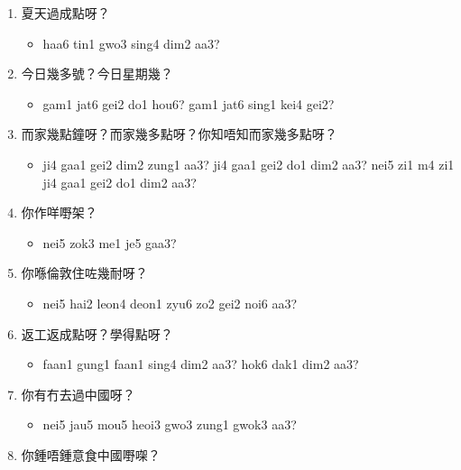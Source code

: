 \documentclass[12pt,a4paper]{leaflet}
\begin{document}
\begin{tcolorbox}[enhanced, breakable, skin first=enhanced, skin middle=enhanced, skin last=enhanced,colback=LightGreen!20!white, colframe=LightGreen!50!black, boxrule=0.5mm]
\begin{enumerate}[label={},leftmargin=0pt, itemindent=0pt]
\begin{itemize}[label={},leftmargin=0pt, itemindent=0pt]
\end{itemize}
\item \LARGE{夏天過成點呀？}
\begin{itemize}[label={},leftmargin=0pt, itemindent=0pt]
\item \footnotesize\textsf{haa6 tin1 gwo3 sing4 dim2 aa3?}
\end{itemize}
\item \LARGE{今日幾多號？今日星期幾？}
\begin{itemize}[label={},leftmargin=0pt, itemindent=0pt]
\item \footnotesize\textsf{gam1 jat6 gei2 do1 hou6? gam1 jat6 sing1 kei4 gei2?}
\end{itemize}
\item \LARGE{而家幾點鐘呀？而家幾多點呀？你知唔知而家幾多點呀？}
\begin{itemize}[label={},leftmargin=0pt, itemindent=0pt]
\item \footnotesize\textsf{ji4 gaa1 gei2 dim2 zung1 aa3? ji4 gaa1 gei2 do1 dim2 aa3? nei5 zi1 m4 zi1 ji4 gaa1 gei2 do1 dim2 aa3?}
\end{itemize}
\item \LARGE{你作咩嘢架？}
\begin{itemize}[label={},leftmargin=0pt, itemindent=0pt]
\item \footnotesize\textsf{nei5 zok3 me1 je5 gaa3?}
\end{itemize}
\item \LARGE{你喺倫敦住咗幾耐呀？}
\begin{itemize}[label={},leftmargin=0pt, itemindent=0pt]
\item \footnotesize\textsf{nei5 hai2 leon4 deon1 zyu6 zo2 gei2 noi6 aa3?}
\end{itemize}
\item \LARGE{返工返成點呀？學得點呀？}
\begin{itemize}[label={},leftmargin=0pt, itemindent=0pt]
\item \footnotesize\textsf{faan1 gung1 faan1 sing4 dim2 aa3? hok6 dak1 dim2 aa3?}
\end{itemize}
\item \LARGE{你有冇去過中國呀？}
\begin{itemize}[label={},leftmargin=0pt, itemindent=0pt]
\item \footnotesize\textsf{nei5 jau5 mou5 heoi3 gwo3 zung1 gwok3 aa3?}
\end{itemize}
\item \LARGE{你鍾唔鍾意食中國嘢㗎？}
\begin{itemize}[label={},leftmargin=0pt, itemindent=0pt]

\end{itemize}
\end{enumerate}
\end{tcolorbox}
\end{document}
